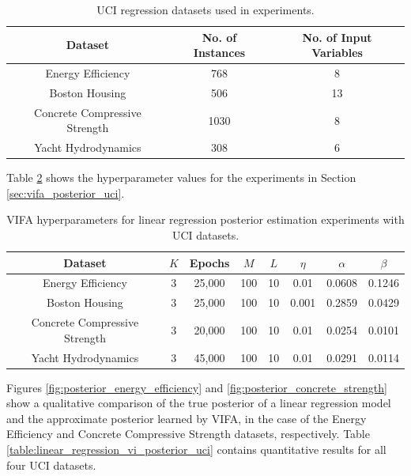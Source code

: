 \documentclass[msc,deptreport.inf]{infthesis} %
\begin{document}
\begin{table}[h!]
	\begin{center}
		\begin{tabular}{||c c c ||} 
			\hline
 			Dataset & No. of Instances & No. of Input Variables \\ [0.5ex] 
			\hline\hline
			Energy Efficiency 				& 768 	& 8 \\
 			\hline
 			Boston Housing 				& 506 	& 13 \\ 
 			\hline
 			Concrete Compressive Strength 	& 1030 	& 8 \\
 			\hline
 			Yacht Hydrodynamics 			& 308 	& 6 \\ [1ex] 
 			\hline
		\end{tabular}
		\caption{UCI regression datasets used in experiments.}
		\label{table:uci_datasets}
	\end{center}
\end{table}

Table \ref{table:vifa_uci_hyperparameters} shows the hyperparameter values for the experiments in Section \ref{sec:vifa_posterior_uci}.

\begin{table}[h!]
	\begin{center}
		\begin{tabular}{||c c c c c c c c||} 
			\hline
 			Dataset & $K$ & Epochs & $M$ & $L$ & $\eta$ & $\alpha$ & $\beta$ \\ [0.5ex] 
			\hline\hline
			Energy Efficiency 				& 3 & 25,000 & 100 & 10 	& 0.01 	& 0.0608 & 0.1246 \\ 
 			\hline
			Boston Housing 				& 3 & 25,000 & 100 & 10 	& 0.001 	& 0.2859 & 0.0429 \\
 			\hline
 			Concrete Compressive Strength	& 3 & 20,000 & 100 & 10 	& 0.01 	& 0.0254 & 0.0101 \\
 			\hline
 			Yacht Hydrodynamics 			& 3 & 45,000 & 100 & 10 	& 0.01 	& 0.0291 & 0.0114 \\ [1ex] 
 			\hline
		\end{tabular}
		\caption{VIFA hyperparameters for linear regression posterior estimation experiments with UCI datasets.}
		\label{table:vifa_uci_hyperparameters}
	\end{center}
\end{table}

Figures \ref{fig:posterior_energy_efficiency} and \ref{fig:posterior_concrete_strength} show a qualitative comparison of the true posterior of a linear regression model and the approximate posterior learned by VIFA, in the case of the Energy Efficiency and Concrete Compressive Strength datasets, respectively. Table \ref{table:linear_regression_vi_posterior_uci} contains quantitative results for all four UCI datasets. 
\end{document}
